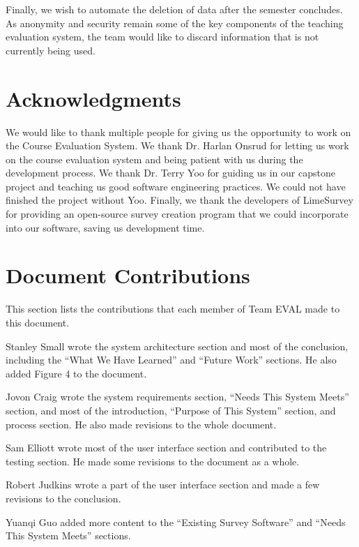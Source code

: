 \documentclass{article}
\begin{document}
Finally, we wish to automate the deletion of data after the semester concludes. As anonymity and security remain some of the key components of the teaching evaluation system, the team would like to discard information that is not currently being used. 

\section{Acknowledgments}

We would like to thank multiple people for giving us the opportunity to work on the Course Evaluation System. We thank Dr. Harlan Onsrud for letting us work on the course evaluation system and being patient with us during the development process. We thank Dr. Terry Yoo for guiding us in our capstone project and teaching us good software engineering practices. We could not have finished the project without Yoo. Finally, we thank the developers of LimeSurvey for providing an open-source survey creation program that we could incorporate into our software, saving us development time.

\newpage
\appendix

\section{Document Contributions}

This section lists the contributions that each member of Team EVAL made to this document.

\medskip

Stanley Small wrote the system architecture section and most of the conclusion, including the ``What We Have Learned'' and ``Future Work'' sections. He also added Figure 4 to the document.

Jovon Craig wrote the system requirements section, ``Needs This System Meets'' section, and most of the introduction, ``Purpose of This System'' section, and process section. He also made revisions to the whole document.

Sam Elliott wrote most of the user interface section and contributed to the testing section. He made some revisions to the document as a whole.

Robert Judkins wrote a part of the user interface section and made a few revisions to the conclusion.

Yuanqi Guo added more content to the ``Existing Survey Software'' and ``Needs This System Meets'' sections. 

\newpage
\end{document}
